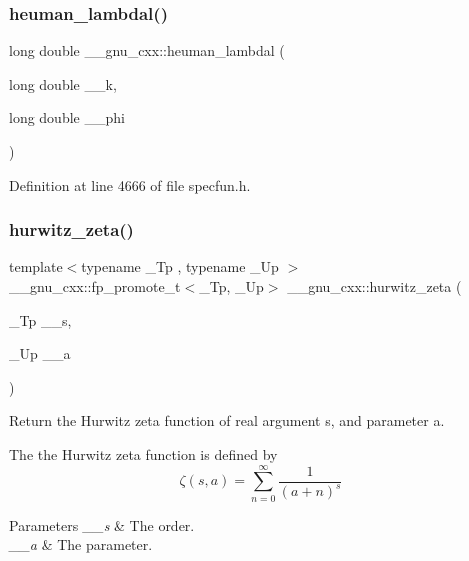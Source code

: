 \subsubsection{\texorpdfstring{heuman\+\_\+lambdal()}{heuman\_lambdal()}}
{\footnotesize\ttfamily long double \+\_\+\+\_\+gnu\+\_\+cxx\+::heuman\+\_\+lambdal (\begin{DoxyParamCaption}\item[{long double}]{\+\_\+\+\_\+k,  }\item[{long double}]{\+\_\+\+\_\+phi }\end{DoxyParamCaption})\hspace{0.3cm}{\ttfamily [inline]}}



Definition at line 4666 of file specfun.\+h.

\mbox{\label{group__mathsf__gnu_ga7b167ce1c8d9aa6aad40fc83a95733bd}} 
\subsubsection{\texorpdfstring{hurwitz\+\_\+zeta()}{hurwitz\_zeta()}\hspace{0.1cm}{\footnotesize\ttfamily [1/2]}}
{\footnotesize\ttfamily template$<$typename \+\_\+\+Tp , typename \+\_\+\+Up $>$ \\
\+\_\+\+\_\+gnu\+\_\+cxx\+::fp\+\_\+promote\+\_\+t$<$\+\_\+\+Tp, \+\_\+\+Up$>$ \+\_\+\+\_\+gnu\+\_\+cxx\+::hurwitz\+\_\+zeta (\begin{DoxyParamCaption}\item[{\+\_\+\+Tp}]{\+\_\+\+\_\+s,  }\item[{\+\_\+\+Up}]{\+\_\+\+\_\+a }\end{DoxyParamCaption})\hspace{0.3cm}{\ttfamily [inline]}}

Return the Hurwitz zeta function of real argument {\ttfamily s}, and parameter {\ttfamily a}.

The the Hurwitz zeta function is defined by \[ \zeta(s, a) = \sum_{n=0}^{\infty}\frac{1}{(a + n)^s} \]


\begin{DoxyParams}{Parameters}
{\em \+\_\+\+\_\+s} & The order. \\
\hline
{\em \+\_\+\+\_\+a} & The parameter. \\
\hline
\end{DoxyParams}


